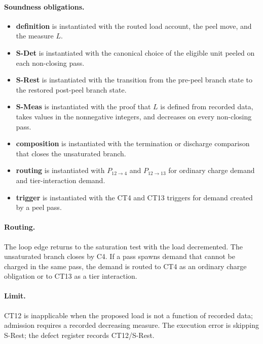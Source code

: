 \documentclass[
  11pt,
]{article}
\providecommand{\tightlist}{%
  \setlength{\itemsep}{0pt}\setlength{\parskip}{0pt}}
\theoremstyle{definition}
\newcommand{\ctpar}[1]{\paragraph{#1.}}
\begin{document}
\ctpar{Soundness obligations}
\begin{itemize}
\tightlist
\item \textbf{definition} is instantiated with the routed load account, the peel move, and the measure \(L\).
\item \textbf{S-Det} is instantiated with the canonical choice of the eligible unit peeled on each non-closing pass.
\item \textbf{S-Rest} is instantiated with the transition from the pre-peel branch state to the restored post-peel branch state.
\item \textbf{S-Meas} is instantiated with the proof that \(L\) is defined from recorded data, takes values in the nonnegative integers, and decreases on every non-closing pass.
\item \textbf{composition} is instantiated with the termination or discharge comparison that closes the unsaturated branch.
\item \textbf{routing} is instantiated with \(P_{12\to4}\) and \(P_{12\to13}\) for ordinary charge demand and tier-interaction demand.
\item \textbf{trigger} is instantiated with the CT4 and CT13 triggers for demand created by a peel pass.
\end{itemize}

\ctpar{Routing}
The loop edge returns to the saturation test with the load decremented.
The unsaturated branch closes by C4.  If a pass spawns demand that cannot
be charged in the same pass, the demand is routed to CT4 as an ordinary
charge obligation or to CT13 as a tier interaction.

\ctpar{Limit}
CT12 is inapplicable when the proposed load is not a function of recorded
data; admission requires a recorded decreasing measure. The execution
error is skipping S-Rest; the defect register records CT12/S-Rest.
\end{document}
